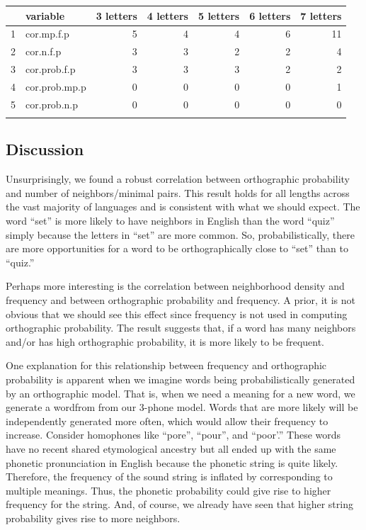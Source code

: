 \documentclass{article}
\begin{document}
\begin{table}[ht]
\centering
\begin{tabular}{rlrrrrr}
  \hline
 & variable & 3  letters & 4  letters & 5  letters & 6  letters & 7  letters \\ 
  \hline
1 & cor.mp.f.p &   5 &   4 &   4 &   6 &  11 \\ 
  2 & cor.n.f.p &   3 &   3 &   2 &   2 &   4 \\ 
  3 & cor.prob.f.p &   3 &   3 &   3 &   2 &   2 \\ 
  4 & cor.prob.mp.p &   0 &   0 &   0 &   0 &   1 \\ 
  5 & cor.prob.n.p &   0 &   0 &   0 &   0 &   0 \\ 
   \hline
\label{cor.table}
\end{tabular}
\end{table}


\subsection{Discussion}

Unsurprisingly, we found a robust correlation between orthographic probability and number of neighbors/minimal
pairs. This result holds for all lengths across the vast majority of languages and is consistent with what we
should expect. The word ``set'' is more likely to have neighbors in English than the word ``quiz'' simply
because the letters in ``set'' are more common. So, probabilistically, there are more opportunities for a word
to be orthographically close to ``set'' than to ``quiz.''

Perhaps more interesting is the correlation between neighborhood density and frequency and between orthographic
probability and frequency. A prior, it is not obvious that we should see this effect since frequency is not
used in computing orthographic probability. The result suggests that, if a word has many neighbors and/or has
high orthographic probability, it is
more likely to be frequent. 

One explanation for this relationship between frequency and orthographic probability is apparent when we
imagine words being probabilistically generated by an orthographic model. That is, when we need a meaning for
a new word, we generate a wordfrom from our 3-phone model. Words that are more likely will be independently generated more
often, which would allow their frequency to increase. Consider homophones like ``pore'', ``pour'', and
``poor'.'' These words have no recent shared etymological ancestry but all ended up with the same phonetic
pronunciation in English because the phonetic string is quite likely. Therefore, the frequency of the sound
string is inflated by corresponding to multiple meanings. Thus, the phonetic probability could give rise to
higher frequency for the string. And, of course, we already have seen that higher string probability gives
rise to more neighbors.
\end{document}
